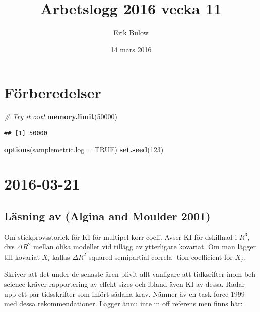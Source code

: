 \documentclass[]{article}
\title{Arbetslogg 2016 vecka 11}
\author{Erik Bulow}
\date{14 mars 2016}
\newenvironment{Shaded}{\begin{snugshade}}{\end{snugshade}}
\newcommand{\KeywordTok}[1]{\textcolor[rgb]{0.13,0.29,0.53}{\textbf{{#1}}}}
\newcommand{\DataTypeTok}[1]{\textcolor[rgb]{0.13,0.29,0.53}{{#1}}}
\newcommand{\DecValTok}[1]{\textcolor[rgb]{0.00,0.00,0.81}{{#1}}}
\newcommand{\CommentTok}[1]{\textcolor[rgb]{0.56,0.35,0.01}{\textit{{#1}}}}
\newcommand{\OtherTok}[1]{\textcolor[rgb]{0.56,0.35,0.01}{{#1}}}
\newcommand{\NormalTok}[1]{{#1}}
\begin{document}
\maketitle

{
\hypersetup{linkcolor=black}
\setcounter{tocdepth}{2}
\tableofcontents
}
\section{Förberedelser}\label{forberedelser}

\begin{Shaded}
\begin{Highlighting}[]
\CommentTok{# Try it out!}
\KeywordTok{memory.limit}\NormalTok{(}\DecValTok{50000}\NormalTok{)}
\end{Highlighting}
\end{Shaded}

\begin{verbatim}
## [1] 50000
\end{verbatim}

\begin{Shaded}
\begin{Highlighting}[]
\KeywordTok{options}\NormalTok{(}\DataTypeTok{samplemetric.log =} \OtherTok{TRUE}\NormalTok{)}
\KeywordTok{set.seed}\NormalTok{(}\DecValTok{123}\NormalTok{)}
\end{Highlighting}
\end{Shaded}

\section{2016-03-21}\label{section}

\subsection{Läsning av (Algina and Moulder
2001)}\label{lasning-av-algina2001}

Om stickprovsstorlek för KI för multipel korr coeff. Avser KI för
dskillnad i \(R^3\), dvs \(\Delta R^2\) mellan olika modeller vid
tillägg av ytterligare kovariat. Om man lägger till kovariat \(X_i\)
kallas \(\Delta R^2\) squared semipartial correla- tion coefficient for
\(X_j\).

Skriver att det under de senaste åren blivit allt vanligare att
tidksrifter inom beh science kräver rapportering av effekt sizes och
ibland även KI av dessa. Radar upp ett par tidsskrifter som infört
sådana krav. Nämner äv en task force 1999 med dessa rekommendationer.
Lägger ännu inte in off referens men finns här:
\end{document}
